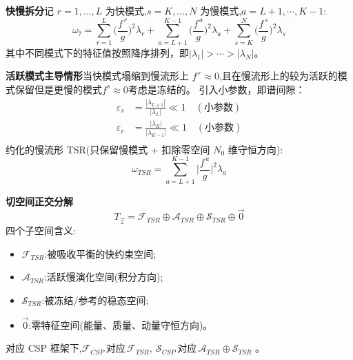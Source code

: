 \documentclass[11pt,a4paper]{article}
\begin{document}
\noindent\textbf{快慢拆分}\quad 记 $r=1,\dots,L$ 为快模式,$s=K,\dots,N$ 为慢模式,$a=L+1,\cdots ,K-1$:
\begin{equation}
\omega_{\hat\tau}=\sum_{r=1}^{L}\Big(\frac{f^{\,r}}{g}\Big)^{2}\lambda_r+\sum_{a=L+1}^{K-1}\Big(\frac{f^{\,a}}{g}\Big)^{2}\lambda_a+\sum_{s=K}^{N}\Big(\frac{f^{\,s}}{g}\Big)^{2}\lambda_s
\end{equation}
其中不同模式下的特征值按照降序排列，即$|\lambda_1|>\cdots>|\lambda_N|$。

\noindent\textbf{活跃模式主导情形}\quad 当快模式塌缩到慢流形上 $f^{\,r}\approx 0$,且在慢流形上的较为活跃的模式保留但是更慢的模式$f^s\approx0$考虑是冻结的。
引入小参数，即谱间隙：
\begin{align}
\varepsilon_s &=\frac{|\lambda_{L+1}|}{|\lambda_{L}|}\ll 1\quad(\text{小参数})\\
\varepsilon_r &=\frac{|\lambda_{K}|}{|\lambda_{K-1}|}\ll 1\quad(\text{小参数})\\
\end{align}
约化的慢流形 TSR(只保留慢模式 + 扣除零空间 $N_0$ 维守恒方向):
\begin{equation}
\omega_{TSR}=\sum_{a=L+1}^{K-1}\Big|\frac{f^{\,a}}{g}\Big|^{2}\lambda_a
\end{equation}

\noindent\textbf{切空间正交分解}\quad
\begin{equation}
\boxed{\;T_{\vec z}=\mathcal F_{TSR}\oplus \mathcal A_{TSR}\oplus \mathcal S_{TSR}\oplus\vec 0\;}
\end{equation}
四个子空间含义:
\begin{itemize}[leftmargin=2em]
\item $\mathcal F_{TSR}$:被吸收平衡的快约束空间;
\item $\mathcal A_{TSR}$:活跃慢演化空间(积分方向);
\item $\mathcal S_{TSR}$:被冻结/参考的稳态空间;
\item $\vec 0$:零特征空间(能量、质量、动量守恒方向)。
\end{itemize}
对应 CSP 框架下,$\mathcal F_{CSP}\,\text{对应}\,\mathcal F_{TSR},\ \mathcal S_{CSP}\,\text{对应}\,\mathcal A_{TSR}\oplus \mathcal S_{TSR}$ 。
\end{document}
